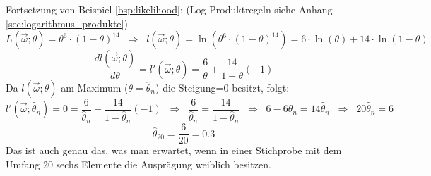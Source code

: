 \begin{bsp}\label{bsp:likelihood_2}
Fortsetzung von Beispiel \ref{bsp:likelihood}: (Log-Produktregeln siehe Anhang \ref{sec:logarithmus_produkte})
\[L(\vec\omega;\theta)=\theta^6\cdot(1-\theta)^{14}\;\;\Rightarrow\;\;l(\vec\omega;\theta)=\ln(\theta^6\cdot (1-\theta)^{14})=6\cdot \ln(\theta)+14\cdot \ln(1-\theta)\]
\[\frac{dl(\vec\omega;\theta)}{d\theta}=l'(\vec\omega;\theta)=\frac{6}{\theta}+\frac{14}{1-\theta}(-1)\]
Da $l(\vec\omega;\theta)$ am Maximum ($\theta=\hat\theta_n$) die Steigung=$0$ besitzt, folgt:
\[l'(\vec\omega;\hat\theta_n)=0=\frac{6}{\hat\theta_n}+\frac{14}{1-\hat\theta_n}(-1)\;\;\Rightarrow\;\;\frac{6}{\hat\theta_n}=\frac{14}{1-\hat\theta_n}\;\;\Rightarrow\;\;6-6\hat\theta_n=14\hat\theta_n\;\;\Rightarrow\;\;20\hat\theta_n=6\]
\[\hat\theta_{20}=\frac{6}{20}=0.3\]
Das ist auch genau das, was man erwartet, wenn in einer Stichprobe mit dem Umfang $20$ sechs Elemente die Ausprägung weiblich besitzen.
\end{bsp}


